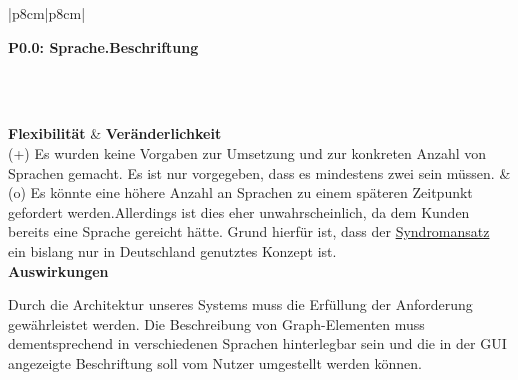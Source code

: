 \documentclass[enabledeprecatedfontcommands,fontsize=11pt,paper=a4,twoside]{scrartcl}
\newcounter{one}
\newcounter{two}[one]
\newcommand{\tone}{0\theone}
\newcommand{\two}{\stepcounter{two}0\thetwo}
\begin{document}
\begin{tabular} {|p{8cm}|p{8cm}|}
	\hline
	 {\parbox{16cm}{\textbf{\hypertarget{hh}{P\tone.\two}: Sprache.Beschriftung}} } \\  \hline\hline 
	\rule{0pt}{6ex}\\ [3ex] \hline
	\textbf{Flexibilität}  & \textbf{Veränderlichkeit} \\
	(+) Es wurden keine Vorgaben zur Umsetzung und zur konkreten Anzahl von Sprachen gemacht. Es ist nur vorgegeben, dass es mindestens zwei sein müssen. &
	(o) Es könnte eine höhere Anzahl an Sprachen zu einem späteren Zeitpunkt gefordert werden.Allerdings ist dies eher unwahrscheinlich, da dem Kunden bereits eine Sprache gereicht hätte. Grund hierfür ist, dass der \hyperlink{Syndromansatz}{Syndromansatz} ein bislang nur in Deutschland genutztes Konzept ist. \\
	\hline
	 {\textbf{Auswirkungen}} \\
	 {\parbox{16cm}{Durch die Architektur unseres Systems muss die Erfüllung der Anforderung gewährleistet werden. Die Beschreibung von Graph-Elementen muss dementsprechend in verschiedenen Sprachen hinterlegbar sein und die in der GUI angezeigte Beschriftung soll vom Nutzer umgestellt werden können. } }\\ \hline
\end{tabular}
\newpage
\end{document}

